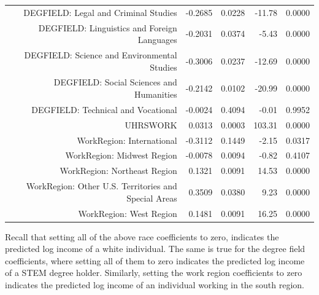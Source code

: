 \documentclass{article}
\begin{document}
\begin{table}[ht]
\begin{tabular}{rrrrr}
$$      DEGFIELD: Legal and Criminal Studies & -0.2685 & 0.0228 & -11.78 & 0.0000 \\ 
      DEGFIELD: Linguistics and Foreign Languages & -0.2031 & 0.0374 & -5.43 & 0.0000 \\ 
      DEGFIELD: Science and Environmental Studies & -0.3006 & 0.0237 & -12.69 & 0.0000 \\ 
      DEGFIELD: Social Sciences and Humanities & -0.2142 & 0.0102 & -20.99 & 0.0000 \\ 
      DEGFIELD: Technical and Vocational & -0.0024 & 0.4094 & -0.01 & 0.9952 \\ 
      UHRSWORK & 0.0313 & 0.0003 & 103.31 & 0.0000 \\ 
      WorkRegion: International & -0.3112 & 0.1449 & -2.15 & 0.0317 \\ 
      WorkRegion: Midwest Region & -0.0078 & 0.0094 & -0.82 & 0.4107 \\ 
      WorkRegion: Northeast Region & 0.1321 & 0.0091 & 14.53 & 0.0000 \\ 
      WorkRegion: Other U.S. Territories and Special Areas & 0.3509 & 0.0380 & 9.23 & 0.0000 \\ 
      WorkRegion: West Region & 0.1481 & 0.0091 & 16.25 & 0.0000 \\ 
       \hline
    \end{tabular}
\end{table}
Recall that setting all of the above race coefficients to zero, indicates the predicted log income of a white individual.
The same is true for the degree field coefficients, where setting all of them to zero indicates the predicted log income of a STEM degree holder.
Similarly, setting the work region coefficients to zero indicates the predicted log income of an individual working in the south region.
\end{document}
